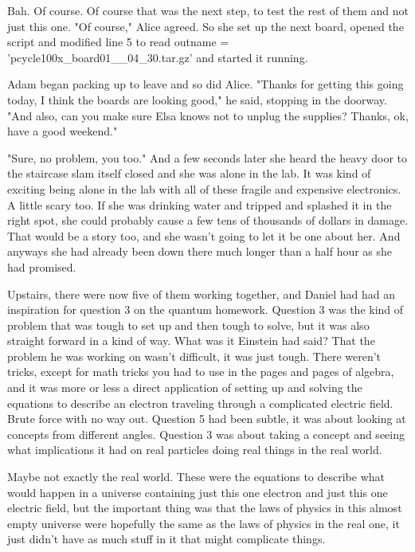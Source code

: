 Bah. Of course. Of course that was the next step, to test the rest of them and not just this one. "Of course," Alice agreed. So she set up the next board, opened the script and modified line 5 to read {\ttfamily outname =} {\ttfamily  'pcycle100x\_\-board01\_\_04\_30.tar.gz'} and started it running.

Adam began packing up to leave and so did Alice. "Thanks for getting this going today, I think the boards are looking good," he said, stopping in the doorway. "And also, can you make sure Elsa knows not to unplug the supplies? Thanks, ok, have a good weekend."

"Sure, no problem, you too." And a few seconds later she heard the heavy door to the staircase slam itself closed and she was alone in the lab. It was kind of exciting being alone in the lab with all of these fragile and expensive electronics. A little scary too. If she was drinking water and tripped and splashed it in the right spot, she could probably cause a few tens of thousands of dollars in damage. That would be a story too, and she wasn't going to let it be one about her. And anyways she had already been down there much longer than a half hour as she had promised.

\mypause

Upstairs, there were now five of them working together, and Daniel had had an inspiration for question 3 on the quantum homework. Question 3 was the kind of problem that was tough to set up and then tough to solve, but it was also straight forward in a kind of way. What was it Einstein had said? That the problem he was working on wasn't difficult, it was just tough. There weren't tricks, except for math tricks you had to use in the pages and pages of algebra, and it was more or less a direct application of setting up and solving the equations to describe an electron traveling through a complicated electric field. Brute force with no way out. Question 5 had been subtle, it was about looking at concepts from different angles. Question 3 was about taking a concept and seeing what implications it had on real particles doing real things in the real world. 

Maybe not exactly the real world. These were the equations to describe what would happen in a universe containing just this one electron and just this one electric field, but the important thing was that the laws of physics in this almost empty universe were hopefully the same as the laws of physics in the real one, it just didn't have as much stuff in it that might complicate things. 

